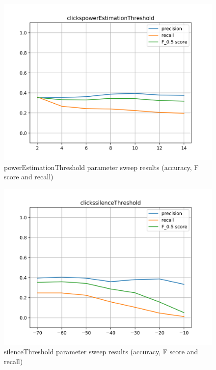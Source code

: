 \begin{figure}[!ht]
	\includegraphics[clip,width=\columnwidth]{Figures/clickspowerEstimationThreshold.png}%
	\caption{powerEstimationThreshold parameter sweep results (accuracy, F score and recall)}
	\label{fig:accomp}
\end{figure}

\begin{figure}[!ht]
	\includegraphics[clip,width=\columnwidth]{Figures/clickssilenceThreshold.png}%
	\caption{silenceThreshold parameter sweep results (accuracy, F score and recall)}
	\label{fig:accomp}
\end{figure}

